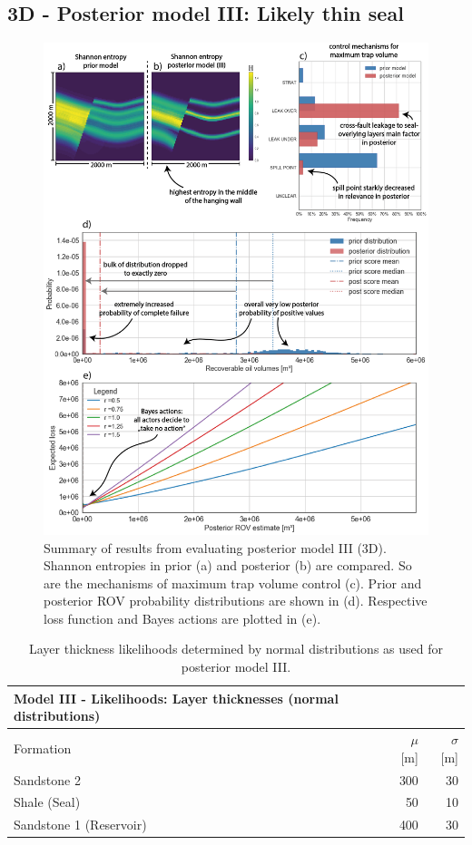 		\subsection{3D - Posterior model III: Likely thin seal}%
		\begin{figure}[p!]
			\centering
			\includegraphics[width=1\textwidth]{Figures/ML2}
			\caption{Summary of results from evaluating posterior model III (3D). Shannon entropies in prior (a) and posterior (b) are compared. So are the mechanisms of maximum trap volume control (c). Prior and posterior ROV probability distributions are shown in (d). Respective loss function and Bayes actions are plotted in (e).}\label{fig:ML2}
		\end{figure}
		\begin{table}[h]
			\centering
			\begin{tabular}{lrr} 
				\toprule
				Model III - Likelihoods: Layer thicknesses (normal distributions)\\  
				\midrule 
				Formation & $\mu$ [m] & $\sigma$ [m]\\ 
				\midrule 
				Sandstone 2 & 300 & 30 \\
				Shale (Seal) & 50 & 10\\ 
				Sandstone 1 (Reservoir) & 400 & 30 \\
				\bottomrule
			\end{tabular}
			\caption{Layer thickness likelihoods determined by normal distributions as used for posterior model III.}
			\label{tab:ML2_likelihoods}
		\end{table}
